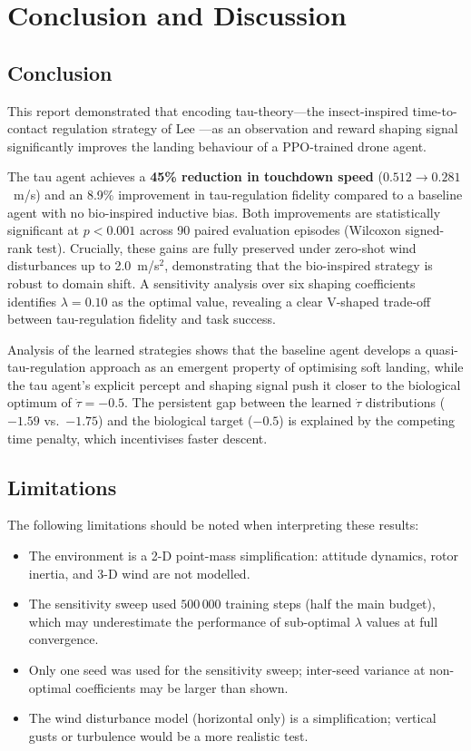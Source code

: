 \chapter{Conclusion and Discussion}
\label{ch:conclusion}

\section{Conclusion}
\label{sec:conclusion}

This report demonstrated that encoding tau-theory---the insect-inspired time-to-contact
regulation strategy of Lee \cite{lee1976}---as an observation and reward shaping signal
significantly improves the landing behaviour of a PPO-trained drone agent.

The tau agent achieves a \textbf{45\% reduction in touchdown speed}
($0.512 \rightarrow 0.281$~m/s) and an 8.9\% improvement in tau-regulation fidelity
compared to a baseline agent with no bio-inspired inductive bias.
Both improvements are statistically significant at $p < 0.001$ across 90 paired
evaluation episodes (Wilcoxon signed-rank test).
Crucially, these gains are fully preserved under zero-shot wind disturbances up to
2.0~m/s$^2$, demonstrating that the bio-inspired strategy is robust to domain shift.
A sensitivity analysis over six shaping coefficients identifies $\lambda = 0.10$ as
the optimal value, revealing a clear V-shaped trade-off between tau-regulation fidelity
and task success.

Analysis of the learned strategies shows that the baseline agent develops a
quasi-tau-regulation approach as an emergent property of optimising soft landing,
while the tau agent's explicit percept and shaping signal push it closer to the
biological optimum of $\dot{\tau} = -0.5$.
The persistent gap between the learned $\dot{\tau}$ distributions ($-1.59$ vs.\ $-1.75$)
and the biological target ($-0.5$) is explained by the competing time penalty, which
incentivises faster descent.

\section{Limitations}
\label{sec:limitations}

The following limitations should be noted when interpreting these results:
\begin{itemize}
  \item The environment is a 2-D point-mass simplification: attitude dynamics, rotor
        inertia, and 3-D wind are not modelled.
  \item The sensitivity sweep used $500\,000$ training steps (half the main budget),
        which may underestimate the performance of sub-optimal $\lambda$ values at full
        convergence.
  \item Only one seed was used for the sensitivity sweep; inter-seed variance at
        non-optimal coefficients may be larger than shown.
  \item The wind disturbance model (horizontal only) is a simplification;
        vertical gusts or turbulence would be a more realistic test.
\end{itemize}


